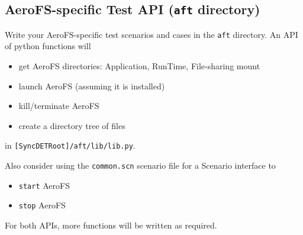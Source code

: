 \subsection{AeroFS-specific Test API ({\tt aft} directory)}
Write your AeroFS-specific test scenarios and cases in the {\tt aft} directory.
An API of python functions will
\begin{itemize}
\item get AeroFS directories: Application, RunTime, File-sharing mount
\item launch AeroFS (assuming it is installed)
\item kill/terminate AeroFS
\item create a directory tree of files
\end{itemize}
in {\tt [SyncDETRoot]/aft/lib/lib.py}.

Also consider using the {\tt common.scn} scenario file for a Scenario interface
to
\begin{itemize}
\item {\tt start} AeroFS
\item {\tt stop} AeroFS
\end{itemize}

For both APIs, more functions will be written as required.

